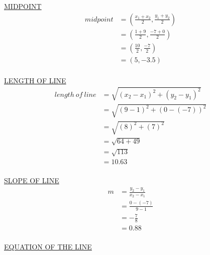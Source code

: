 \documentclass{article}
\begin{document}
\begin{description}
        \underline{MIDPOINT}
        $$
            \begin{aligned}
                midpoint & = (\frac{x_1+x_2}{2}, \frac{y_1+y_2}{2}) \\
                         & = (\frac{1+9}{2}, \frac{-7+0}{2})        \\
                         & = (\frac{10}{2}, \frac{-7}{2})           \\
                         & = (5, -3.5)                              \\
            \end{aligned}
        $$

        \underline{LENGTH OF LINE}
        $$
            \begin{aligned}
                length \ of \ line & = \sqrt{(x_2-x_1)^2 + (y_2-y_1)^2} \\
                                   & = \sqrt{(9-1)^2 + (0-(-7))^2}      \\
                                   & = \sqrt{(8)^2 + (7)^2}             \\
                                   & = \sqrt{64 + 49}                   \\
                                   & = \sqrt{113}                       \\
                                   & = 10.63                            \\
            \end{aligned}
        $$

        \underline{SLOPE OF LINE}
        $$
            \begin{aligned}
                m & = \frac{y_2-y_1}{x_2-x_1} \\
                  & = \frac{0-(-7)}{9-1}      \\
                  & = -\frac{7}{8}            \\
                  & = 0.88                    \\
            \end{aligned}
        $$

        \underline{EQUATION OF THE LINE}


\end{description}
\end{document}
